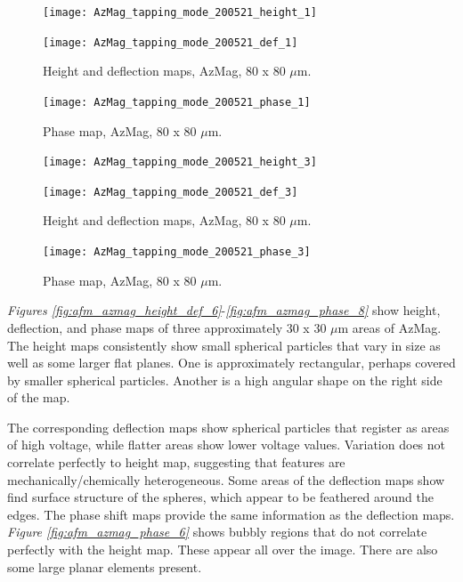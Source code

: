 \begin{figure}[H]
\centering
\begin{minipage}{.45\textwidth}
  \centering
  \texttt{[image: AzMag\_tapping\_mode\_200521\_height\_1]}
\end{minipage}
\begin{minipage}{.45\textwidth}
  \centering
  \texttt{[image: AzMag\_tapping\_mode\_200521\_def\_1]}
\end{minipage}
\caption[Height and deflection maps, AzMag]{Height and deflection maps, AzMag, 80 x 80 $\mu$m.}
\label{fig:afm_azmag_height_def_4}
\end{figure}

\begin{figure}[H]
\centering
  \texttt{[image: AzMag\_tapping\_mode\_200521\_phase\_1]}
\caption[Phase map, AzMag]{Phase map, AzMag, 80 x 80 $\mu$m.}
\label{fig:afm_azmag_phase_4}
\end{figure}


\begin{figure}[H]
\centering
\begin{minipage}{.45\textwidth}
  \centering
  \texttt{[image: AzMag\_tapping\_mode\_200521\_height\_3]}
\end{minipage}
\begin{minipage}{.45\textwidth}
  \centering
  \texttt{[image: AzMag\_tapping\_mode\_200521\_def\_3]}
\end{minipage}
\caption[Height and deflection maps, AzMag]{Height and deflection maps, AzMag, 80 x 80 $\mu$m.}
\label{fig:afm_azmag_height_def_5}
\end{figure}

\begin{figure}[H]
\centering
  \texttt{[image: AzMag\_tapping\_mode\_200521\_phase\_3]}
\caption[Phase map, AzMag]{Phase map, AzMag, 80 x 80 $\mu$m.}
\label{fig:afm_azmag_phase_5}
\end{figure}

\textit{Figures \ref{fig:afm_azmag_height_def_6}}-\textit{\ref{fig:afm_azmag_phase_8}} show height, deflection, and phase maps of three approximately 30 x 30 $\mu$m areas of AzMag. The height maps consistently show small spherical particles that vary in size as well as some larger flat planes. One is approximately rectangular, perhaps covered by smaller spherical particles. Another is a high angular shape on the right side of the map.

The corresponding deflection maps show spherical particles that register as areas of high voltage, while flatter areas show lower voltage values. Variation does not correlate perfectly to height map, suggesting that features are mechanically/chemically heterogeneous. Some areas of the deflection maps show find surface structure of the spheres, which appear to be feathered around the edges. The phase shift maps provide the same information as the deflection maps. \textit{Figure \ref{fig:afm_azmag_phase_6}} shows bubbly regions that do not correlate perfectly with the height map. These appear all over the image. There are also some large planar elements present.

